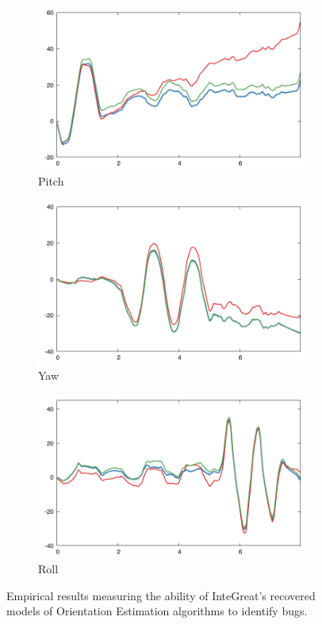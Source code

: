 \begin{figure}
    \centering
    \begin{subfigure}[b]{0.327\textwidth}
        \includegraphics[width=\textwidth]{madg_data/pitch.pdf}
	    \caption{Pitch}
    \label{fig:pitch}
    \end{subfigure}
    \hfill
    \begin{subfigure}[b]{0.327\textwidth}
        \includegraphics[width=\textwidth]{madg_data/yaw.pdf}
        \caption{Yaw}
        \label{fig:yaw}
    \end{subfigure}
    \hfill
    \begin{subfigure}[b]{0.327\textwidth}
        \includegraphics[width=\textwidth]{madg_data/roll.pdf}
        \caption{Roll}
        \label{fig:roll}
    \end{subfigure}
    \hfill
    \caption{Empirical results measuring the ability of InteGreat's recovered models of Orientation Estimation algorithms to identify bugs.}
    \label{fig:madg}
\end{figure}


